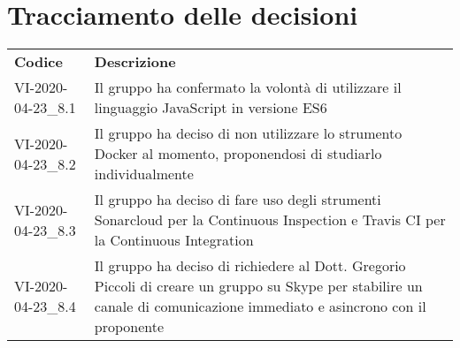\documentclass{article}
\begin{document}
\section{Tracciamento delle decisioni}
\begin{table}[H]
  \centering
  \begin{tabular}{p{4cm}|p{12cm}}
    \rowcolor{lightgray}
    \textbf{Codice}  & \textbf{Descrizione}      \\
     VI-2020-04-23\_8.1 & Il gruppo ha confermato la volontà di utilizzare il linguaggio JavaScript in versione ES6 \\
     VI-2020-04-23\_8.2 & Il gruppo ha deciso di non utilizzare lo strumento Docker al momento, proponendosi di studiarlo individualmente \\
     VI-2020-04-23\_8.3 & Il gruppo ha deciso di fare uso degli strumenti Sonarcloud per la Continuous Inspection e Travis CI per la Continuous Integration \\
     VI-2020-04-23\_8.4 & Il gruppo ha deciso di richiedere al Dott. Gregorio Piccoli di creare un gruppo su Skype per stabilire un canale di comunicazione immediato e asincrono con il proponente \\
  \end{tabular}
\end{table}
\end{document}
